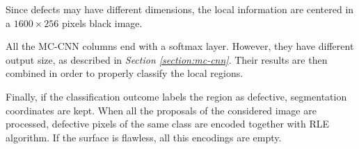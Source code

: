     \par{
        Since defects may have different dimensions, the local information are centered in a $1600\times 256$ pixels black image.
    }
    \par{
        All the MC-CNN columns end with a softmax layer. However, they have different output size, as described in \emph{Section \ref{section:mc-cnn}}. Their results are then combined in order to properly classify the local regions.
    }
    \par{
        Finally, if the classification outcome labels the region as defective, segmentation coordinates are kept. When all the proposals of the considered image are processed, defective pixels of the same class are encoded together with RLE algorithm. If the surface is flawless, all this encodings are empty.
    }